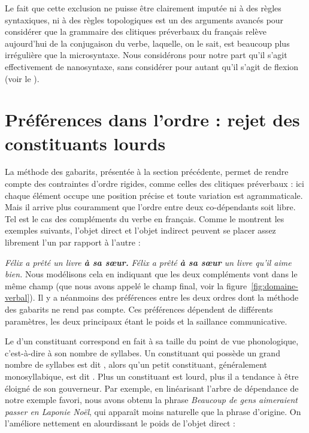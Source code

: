 {    Le fait que cette exclusion ne puisse être clairement imputée ni à des règles syntaxiques, ni à des règles topologiques est un des arguments avancés pour considérer que la grammaire des clitiques préverbaux du français relève aujourd’hui de la conjugaison du verbe, laquelle, on le sait, est beaucoup plus irrégulière que la microsyntaxe. Nous considérons pour notre part qu’il s’agit effectivement de nanosyntaxe, sans considérer pour autant qu’il s’agit de flexion (voir le ).
}
\section{Préférences dans l’ordre : rejet des constituants lourds}\label{sec:3.5.21}

La méthode des gabarits, présentée à la section précédente,  permet de rendre compte des contraintes d’ordre rigides, comme celles des clitiques préverbaux : ici chaque élément occupe une position précise et toute variation est agrammaticale. Mais il arrive plus couramment que l’ordre entre deux co-dépendants soit libre. Tel est le cas des compléments du verbe en français. Comme le montrent les exemples suivants, l’objet direct et l’objet indirect peuvent se placer assez librement l’un par rapport à l’autre :

\ea \ea \textit{{Félix a prêté} un livre \textbf{{à sa sœur.}}}
    \ex \textit{{Félix a prêté} \textbf{{à sa sœur}} un livre qu’il aime bien.}
    \z
\z
Nous modélisons cela en indiquant que les deux compléments vont dans le même champ (que nous avons appelé le champ final, voir la figure~\ref{fig:domaine-verbal}). Il y a néanmoins des préférences entre les deux ordres dont la méthode des gabarits ne rend pas compte. Ces préférences dépendent de différents paramètres, les deux principaux étant le poids et la saillance communicative.

Le  d’un constituant correspond en fait à sa taille du point de vue phonologique, c’est-à-dire à son nombre de syllabes. Un constituant qui possède un grand nombre de syllabes est dit , alors qu’un petit constituant, généralement monosyllabique, est dit . Plus un constituant est lourd, plus il a tendance à être éloigné de son gouverneur. Par exemple, en linéarisant l’arbre de dépendance de notre exemple favori, nous avons obtenu la phrase \textit{Beaucoup de gens aimeraient passer en Laponie Noël}, qui apparaît moins naturelle que la phrase d’origine. On l’améliore nettement en alourdissant le poids de l’objet direct :

